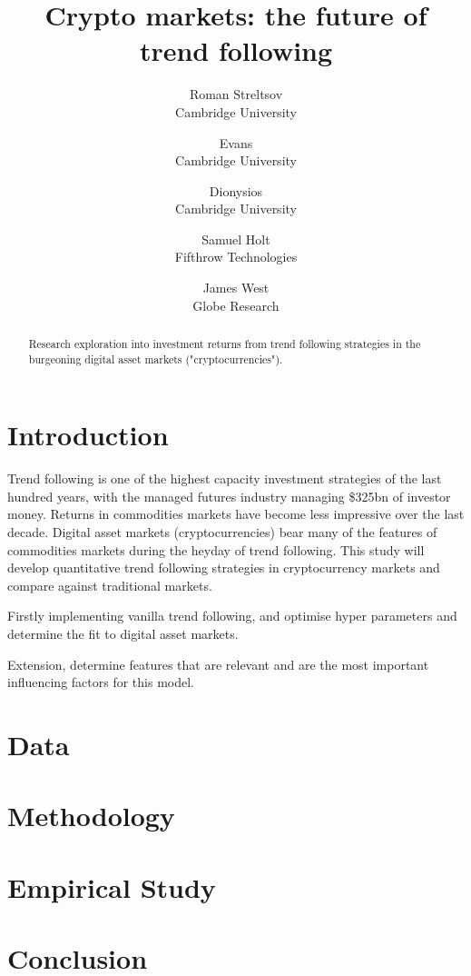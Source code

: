 \documentclass[11pt,a4paper,english]{article}
\title{Crypto markets: the future of trend following}
\author{%
    Roman Streltsov \\
    \small Cambridge University\\
    \and
    Evans \\
    \small Cambridge University\\
    \and
    Dionysios \\
    \small Cambridge University\\
    \and
    Samuel Holt \\
    \small Fifthrow Technologies\\
    \and
    James West\\
    \small Globe Research\\
}
\begin{document}
    \maketitle

    \begin{abstract}
    Research exploration into investment returns from trend following strategies in the burgeoning digital asset markets ("cryptocurrencies").
    \end{abstract}
    \newpage

    \tableofcontents\newpage
    \section{Introduction}
    Trend following is one of the highest capacity investment strategies of the last hundred years, with the managed futures industry managing \$325bn of investor money.
    Returns in commodities markets have become less impressive over the last decade.
    Digital asset markets (cryptocurrencies) bear many of the features of commodities markets during the heyday of trend following.
    This study will develop quantitative trend following strategies in cryptocurrency markets and compare against traditional markets.
    
    Firstly implementing vanilla trend following, and optimise hyper parameters and determine the fit to digital asset markets.

    Extension, determine features that are relevant and are the most important influencing factors for this model.
    \section{Data}
    \section{Methodology}
    \section{Empirical Study}
    \section{Conclusion}
\end{document}
